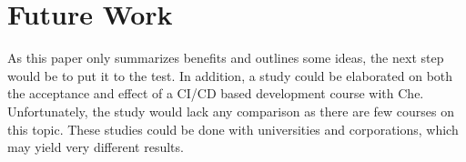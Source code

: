 \documentclass[utf8,biblatex]{lni}
\begin{document}
\section*{Future Work}
As this paper only summarizes benefits and outlines some ideas, the next step would be to put it to the test.
In addition, a study could be elaborated on both the acceptance and effect of a CI/CD based development course with Che. 
Unfortunately, the study would lack any comparison as there are few courses on this topic. 
These studies could be done with universities and corporations, which 
may yield very different results.   

\printbibliography
\end{document}
